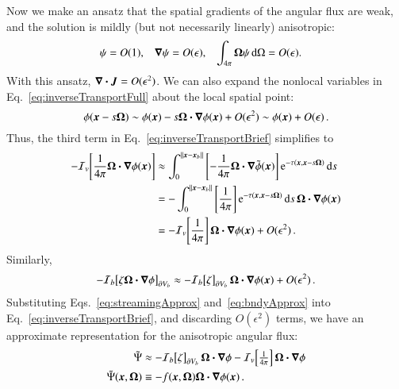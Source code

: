 \documentclass{anstrans}
\begin{document}
Now we make an ansatz that the spatial gradients of the angular flux
are weak, and the solution is mildly (but not necessarily linearly) anisotropic:
\begin{align} \label{eq:ansatz}
  \psi &= O(1), &
  \bm{\nabla} \psi &= O(\epsilon), &
  \int_{4\pi} \bm{\Omega} \psi\mathop{}\!\mathrm{d}\Omega &= O(\epsilon).
\end{align}
With this ansatz, $\bm{\nabla} \bm{\cdot}\bm{J}=O(\epsilon^2)$.
We can also expand the nonlocal variables in Eq.~\eqref{eq:inverseTransportFull} about the local spatial point:
\begin{equation} \label{eq:taylorPhi}
  \phi(\bm{x} - s \bm{\Omega})
  \sim \phi(\bm{x}) - s \bm{\Omega} \bm{\cdot} \bm{\nabla} \phi (\bm{x}) + O(\epsilon^2)
  \sim \phi(\bm{x}) + O(\epsilon) \,.
\end{equation}
Thus, the third term in Eq.~\eqref{eq:inverseTransportBrief} simplifies to
\begin{align}\nonumber
- \mathcal{I}_{v}\!\left[\frac{1}{4\pi} \bm{\Omega}\bm{\cdot} \bm{\nabla} \phi(\bm{x})\right]
  &\approx \int_{0}^{\left\| \bm{x} - \bm{x}_b \right\|}
    \left[ -\frac1{4\pi}\bm{\Omega}\bm{\cdot} \bm{\nabla} \tilde\phi(\bm{x}) \right]
    \mathop{}\!\mathrm{e}^{ -\tau(\bm{x}, \bm{x} - s \bm{\Omega})}
    \mathop{}\!\mathrm{d} s
  \\\nonumber
  &= - \int_{0}^{\left\| \bm{x} - \bm{x}_b \right\|}
    \left[ \frac1{4\pi}\right]
    \mathop{}\!\mathrm{e}^{ -\tau(\bm{x}, \bm{x} - s \bm{\Omega})} \mathop{}\!\mathrm{d} s \,
    \bm{\Omega}\bm{\cdot} \bm{\nabla} \phi(\bm{x})
  \\\label{eq:streamingApprox}
  &= - \mathcal{I}_{v}\!\left[ \frac1{4\pi} \right] \bm{\Omega}\bm{\cdot} \bm{\nabla} \phi(\bm{x}) +
  O(\epsilon^2) \,.
\end{align}
Similarly,
\begin{equation} \label{eq:bndyApprox}
-\mathcal{I}_{b}\!\left[\zeta \bm{\Omega}\bm{\cdot} \bm{\nabla} \phi\right]_{\partial V_b}
\approx -\mathcal{I}_{b}\!\left[\zeta\right]_{\partial V_b} \bm{\Omega}\bm{\cdot} \bm{\nabla} \phi(\bm{x})
+ O(\epsilon^2) \,.
\end{equation}
Substituting Eqs.~\eqref{eq:streamingApprox} and~\eqref{eq:bndyApprox} into
Eq.~\eqref{eq:inverseTransportBrief}, and discarding $O(\epsilon^2)$ terms, we
have an approximate representation for the anisotropic angular flux:
\begin{align} \label{eq:approxPsi2}
  \tilde\Psi
  &\approx 
- \mathcal{I}_{b}\!\left[\zeta\right]_{\partial V_b} \bm{\Omega}\bm{\cdot} \bm{\nabla} \phi
- \mathcal{I}_{v}\!\left[\tfrac{1}{4\pi}\right]  \bm{\Omega}\bm{\cdot} \bm{\nabla} \phi
\\ \label{eq:approxPsi3}
\tilde\Psi(\bm{x}, \bm{\Omega}) &\equiv - f(\bm{x}, \bm{\Omega})
\bm{\Omega}\bm{\cdot} \bm{\nabla} \phi(\bm{x})\,.
\end{align}
\end{document}
